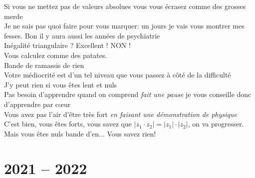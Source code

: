 \documentclass[french, a4paper, openany]{book}
\begin{document}
	\og Si vous ne mettez pas de valeurs absolues vous vous écrasez comme des grosses merde \fg \\
	\og Je ne sais pas quoi faire pour vous marquer: un jours je vais vous montrer mes fesses. Bon il y aura aussi les années de psychiatrie \fg \\
	\og Inégalité triangulaire ? Excellent ! NON ! \fg \\
	\og Vous calculez comme des patates. \fg \\
	\og Bande de ramassis de rien \fg \\
	\og Votre médiocrité est d'un tel niveau que vous passez à côté de la difficulté \fg \\
	\og J'y peut rien si vous êtes lent et nuls \fg \\
	\og Pas besoin d'apprendre quand on comprend \emph{fait une pause} je vous conseille donc d'apprendre par cœur \fg \\
	\og Vous avez pas l'air d'être très fort \fg \emph{en faisant une démonstration de physique} \\
	\og C'est bien, vous êtes forts, vous savez que $\lvert z_1 \cdot z_2 \rvert = \lvert z_1 \rvert \cdot \lvert z_2 \rvert$, on va progresser. Mais vous êtes nuls bande d'en... Vous savez rien! \fg \\

\section{2021 -- 2022}
\end{document}

